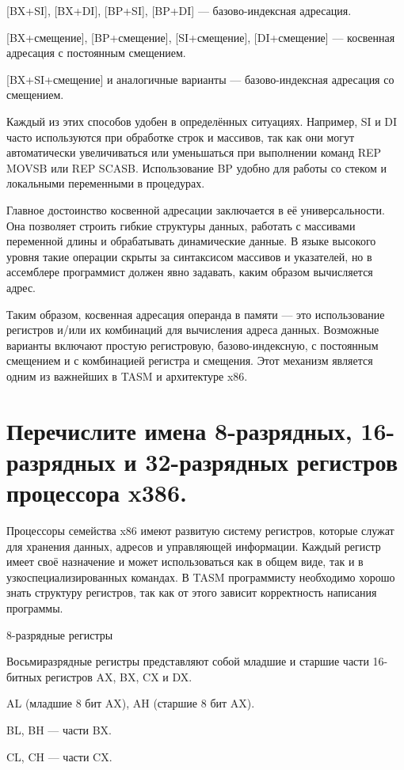 [BX+SI], [BX+DI], [BP+SI], [BP+DI] — базово-индексная адресация.

[BX+смещение], [BP+смещение], [SI+смещение], [DI+смещение] — косвенная адресация с постоянным смещением.

[BX+SI+смещение] и аналогичные варианты — базово-индексная адресация со смещением.

Каждый из этих способов удобен в определённых ситуациях. Например, SI и DI часто используются при обработке строк и массивов, так как они могут автоматически увеличиваться или уменьшаться при выполнении команд REP MOVSB или REP SCASB. Использование BP удобно для работы со стеком и локальными переменными в процедурах.

Главное достоинство косвенной адресации заключается в её универсальности. Она позволяет строить гибкие структуры данных, работать с массивами переменной длины и обрабатывать динамические данные. В языке высокого уровня такие операции скрыты за синтаксисом массивов и указателей, но в ассемблере программист должен явно задавать, каким образом вычисляется адрес.

Таким образом, косвенная адресация операнда в памяти — это использование регистров и/или их комбинаций для вычисления адреса данных. Возможные варианты включают простую регистровую, базово-индексную, с постоянным смещением и с комбинацией регистра и смещения. Этот механизм является одним из важнейших в TASM и архитектуре x86.

\section {Перечислите имена 8-разрядных, 16-разрядных и 32-разрядных регистров процессора x386.}

Процессоры семейства x86 имеют развитую систему регистров, которые служат для хранения данных, адресов и управляющей информации. Каждый регистр имеет своё назначение и может использоваться как в общем виде, так и в узкоспециализированных командах. В TASM программисту необходимо хорошо знать структуру регистров, так как от этого зависит корректность написания программы.

8-разрядные регистры

Восьмиразрядные регистры представляют собой младшие и старшие части 16-битных регистров AX, BX, CX и DX.

AL (младшие 8 бит AX), AH (старшие 8 бит AX).

BL, BH — части BX.

CL, CH — части CX.

